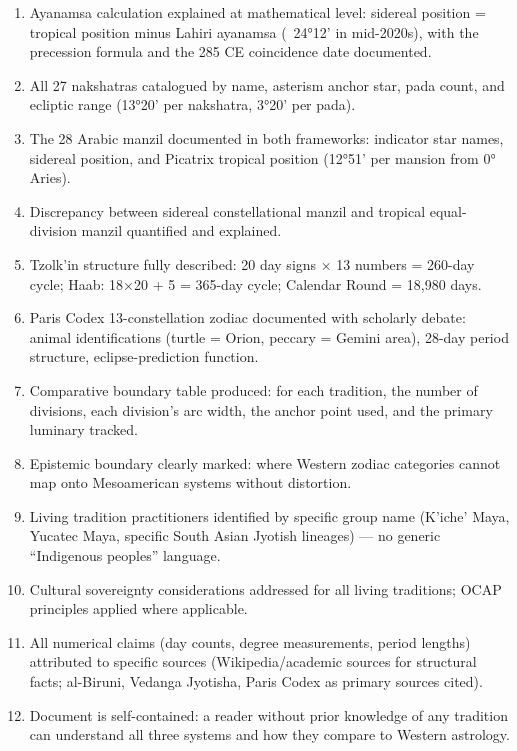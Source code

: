 \documentclass[11pt,letterpaper]{article}
\begin{document}
\begin{enumerate}
  \item Ayanamsa calculation explained at mathematical level: sidereal position = tropical position minus Lahiri ayanamsa (~24°12' in mid-2020s), with the precession formula and the 285 CE coincidence date documented.
  \item All 27 nakshatras catalogued by name, asterism anchor star, pada count, and ecliptic range (13°20' per nakshatra, 3°20' per pada).
  \item The 28 Arabic manzil documented in both frameworks: indicator star names, sidereal position, and Picatrix tropical position (12°51' per mansion from 0° Aries).
  \item Discrepancy between sidereal constellational manzil and tropical equal-division manzil quantified and explained.
  \item Tzolk'in structure fully described: 20 day signs × 13 numbers = 260-day cycle; Haab: 18×20 + 5 = 365-day cycle; Calendar Round = 18,980 days.
  \item Paris Codex 13-constellation zodiac documented with scholarly debate: animal identifications (turtle = Orion, peccary = Gemini area), 28-day period structure, eclipse-prediction function.
  \item Comparative boundary table produced: for each tradition, the number of divisions, each division's arc width, the anchor point used, and the primary luminary tracked.
  \item Epistemic boundary clearly marked: where Western zodiac categories cannot map onto Mesoamerican systems without distortion.
  \item Living tradition practitioners identified by specific group name (K'iche' Maya, Yucatec Maya, specific South Asian Jyotish lineages) --- no generic ``Indigenous peoples'' language.
  \item Cultural sovereignty considerations addressed for all living traditions; OCAP principles applied where applicable.
  \item All numerical claims (day counts, degree measurements, period lengths) attributed to specific sources (Wikipedia/academic sources for structural facts; al-Biruni, Vedanga Jyotisha, Paris Codex as primary sources cited).
  \item Document is self-contained: a reader without prior knowledge of any tradition can understand all three systems and how they compare to Western astrology.
\end{enumerate}
\end{document}
